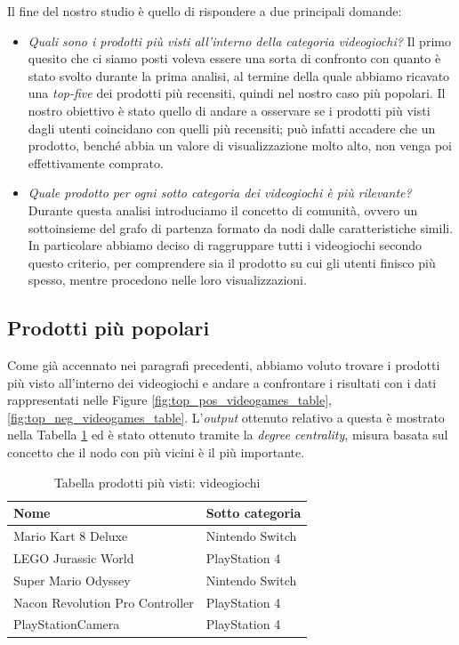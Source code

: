 		Il fine del nostro studio è quello di rispondere a due principali domande: 
		\begin{itemize}
			\item \textit{Quali sono i prodotti più visti all'interno della categoria videogiochi?}
			Il primo quesito che ci siamo posti voleva essere una sorta di confronto con quanto è stato svolto durante la prima analisi, al termine della quale abbiamo ricavato una \textit{top-five} dei prodotti più recensiti, quindi nel nostro caso più popolari. Il nostro obiettivo è stato quello di andare a osservare se i prodotti più visti dagli utenti coincidano con quelli più recensiti; può infatti accadere che un prodotto, benché abbia un valore di visualizzazione molto alto, non venga poi effettivamente comprato.
			
			\item \textit{Quale prodotto per ogni sotto categoria dei videogiochi è più rilevante?}
			Durante questa analisi introduciamo il concetto di comunità, ovvero un sottoinsieme del grafo di partenza formato da nodi dalle caratteristiche simili. In particolare abbiamo deciso di raggruppare tutti i videogiochi secondo questo criterio, per comprendere sia il prodotto su cui gli utenti finisco più spesso, mentre procedono nelle loro visualizzazioni.
		\end{itemize}
	
	
		\subsection{Prodotti più popolari}
			Come già accennato nei paragrafi precedenti, abbiamo voluto trovare i prodotti più visto all'interno dei videogiochi e andare a confrontare i risultati con i dati rappresentati nelle Figure \ref{fig:top_pos_videogames_table}, \ref{fig:top_neg_videogames_table}. L'\textit{output} ottenuto relativo a questa è mostrato nella Tabella \ref{tab:top-five-videogames-network} ed è stato ottenuto tramite la \textit{degree centrality}, misura basata sul concetto che il nodo con più vicini è il più importante.
			
			\begin{table} [H]
				\caption{Tabella prodotti più visti: videogiochi}
				\label{tab:top-five-videogames-network}
				\centering
				\begin{tabular}{ll}
					\toprule 
					\textbf{Nome} & \textbf{Sotto categoria} \\
					\midrule
					Mario Kart 8 Deluxe & Nintendo Switch \\
					LEGO Jurassic World & PlayStation 4 \\
					Super Mario Odyssey & Nintendo Switch \\
					Nacon Revolution Pro Controller & PlayStation 4 \\
					PlayStationCamera & PlayStation 4 \\
					\bottomrule
				\end{tabular}
			\end{table}
			
